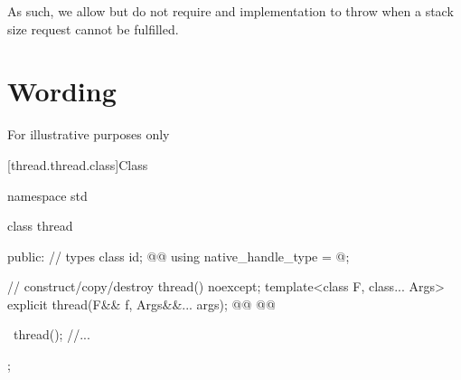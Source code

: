 \documentclass{wg21}
\begin{document}
As such, we allow but do not require and implementation to throw when a stack size request cannot be fulfilled.


\section{Wording}

For illustrative purposes only


[thread.thread.class]{Class }


\begin{codeblock}
namespace std {
    class thread {
        public:
        // types
        class id;
        @@
        using native_handle_type = @\impdefnc@;
        
        // construct/copy/destroy
        thread() noexcept;
        template<class F, class... Args> explicit thread(F&& f, Args&&... args);
        @@ 
        @@
        
        ~thread();
        //...
    };
}
\end{codeblock}
\end{document}
